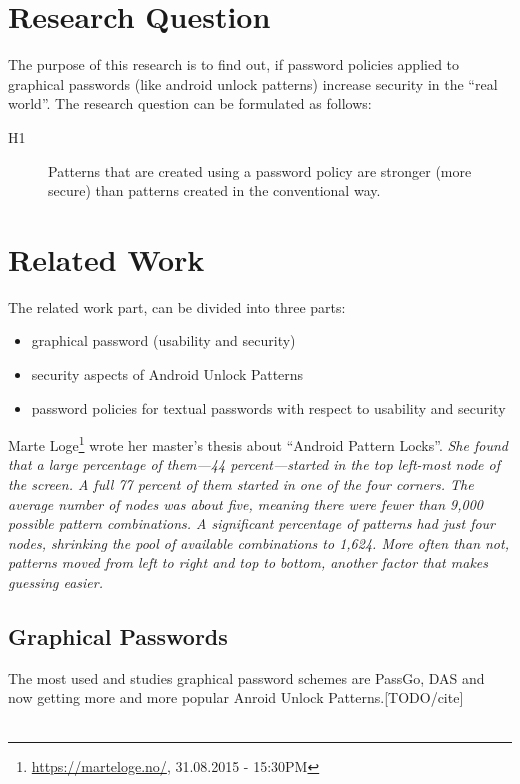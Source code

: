 \documentclass[twocolumn, a4paper, 10pt]{article}
\begin{document}
\section{Research Question}
The purpose of this research is to find out, if password policies applied to graphical passwords (like android unlock patterns) increase security in the ``real world''. The research question can be formulated as follows:\\

\begin{description}
  \item[H1]
  Patterns that are created using a password policy are stronger (more secure) than patterns created in the conventional way.
\end{description}


\section{Related Work}
The related work part, can be divided into three parts:

\begin{itemize}
  \item graphical password (usability and security)
  \item security aspects of Android Unlock Patterns
  \item password policies for textual passwords with respect to usability and security
\end{itemize}

Marte Loge\footnote{\url{https://marteloge.no/}, 31.08.2015 - 15:30PM} wrote her master's thesis about ``Android Pattern Locks''. \emph{She found that a large percentage of them—44 percent—started in the top left-most node of the screen. A full 77 percent of them started in one of the four corners. The average number of nodes was about five, meaning there were fewer than 9,000 possible pattern combinations. A significant percentage of patterns had just four nodes, shrinking the pool of available combinations to 1,624. More often than not, patterns moved from left to right and top to bottom, another factor that makes guessing easier.}

\subsection{Graphical Passwords}

The most used and studies graphical password schemes are PassGo, DAS and now getting more and more popular Anroid Unlock Patterns.[TODO/cite]\\
[ein Satz die DAS und PassGo beschreiben]\\
\end{document}
